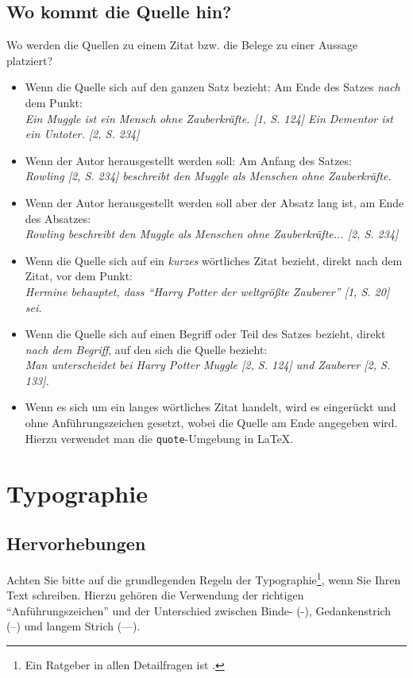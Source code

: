 \documentclass[conference,compsoc,final,a4paper]{IEEEtran}
\begin{document}
\subsection{Wo kommt die Quelle hin?}
Wo werden die Quellen zu einem Zitat bzw. die Belege zu einer Aussage platziert?

\begin{itemize}
\item Wenn die Quelle sich auf den ganzen Satz bezieht: Am Ende des Satzes \textit{nach} dem Punkt:\\ \textit{Ein Muggle ist ein Mensch ohne Zauberkräfte. [1, S. 124] Ein Dementor ist ein Untoter. [2, S. 234]}
\item Wenn der Autor herausgestellt werden soll: Am Anfang des Satzes:\\ \textit{Rowling [2, S. 234] beschreibt den Muggle als Menschen ohne Zauberkräfte.}
\item Wenn der Autor herausgestellt werden soll aber der Absatz lang ist, am Ende des Absatzes:\\ \textit{Rowling beschreibt den Muggle als Menschen ohne Zauberkräfte... [2, S. 234]}
\item Wenn die Quelle sich auf ein \textit{kurzes} wörtliches Zitat bezieht, direkt nach dem Zitat, vor dem Punkt:\\ \textit{Hermine behauptet, dass \enquote{Harry Potter der weltgrößte Zauberer} [1, S. 20] sei.}
\item Wenn die Quelle sich auf einen Begriff oder Teil des Satzes bezieht, direkt \textit{nach dem Begriff}, auf den sich die Quelle bezieht:\\ \textit{Man unterscheidet bei Harry Potter Muggle [2, S. 124] und Zauberer [2, S. 133].}
\item Wenn es sich um ein langes wörtliches Zitat handelt, wird es eingerückt und ohne Anführungszeichen gesetzt, wobei die Quelle am Ende angegeben wird. Hierzu verwendet man die \texttt{quote}-Umgebung in \LaTeX.
\end{itemize}

\section{Typographie}
\subsection{Hervorhebungen}\label{Einleitung:Textauszeichnungen}
Achten Sie bitte auf die grundlegenden Regeln der Typographie\footnote{Ein Ratgeber in allen Detailfragen ist \cite{Forssman2002}.}, wenn Sie Ihren Text schreiben. Hierzu gehören \zb die Verwendung der richtigen "`Anführungszeichen"' und der Unterschied zwischen Binde- (-), Gedankenstrich (--) und langem Strich (---).
\end{document}

